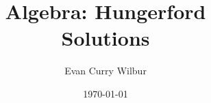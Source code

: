 \documentclass[a4paper,12pt]{book}
\newcommand\<{\ensuremath{\left\langle}}
\renewcommand\>{\ensuremath{\right\rangle}}
\begin{document}
\author{Evan Curry Wilbur}
\title{Algebra: Hungerford\\%
	\large Solutions%
	}
\date{\today}

\frontmatter
\maketitle
\tableofcontents

\mainmatter




\backmatter
\end{document}
